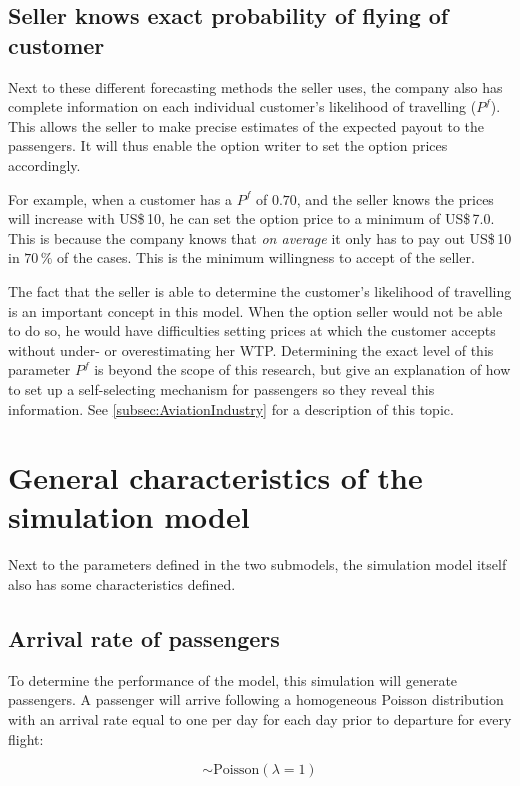 \subsection{Seller knows exact probability of flying of customer}
Next to these different forecasting methods the seller uses, the company also has complete information on each individual customer's likelihood of travelling ($P^f$). This allows the seller to make precise estimates of the expected payout to the passengers. It will thus enable the option writer to set the option prices accordingly.

For example, when a customer has a $P^f$ of $0.70$, and the seller knows the prices will increase with US\$\,10, he can set the option price to a minimum of US\$\,7.0. This is because the company knows that \emph{on average} it only has to pay out US\$\,10 in $70\,\%$ of the cases. This is the minimum willingness to accept of the seller.

The fact that the seller is able to determine the customer's likelihood of travelling is an important concept in this model. When the option seller would not be able to do so, he would have difficulties setting prices at which the customer accepts without under- or overestimating her WTP. Determining the exact level of this parameter $P^f$ is beyond the scope of this research, but  give an explanation of how to set up a self-selecting mechanism for passengers so they reveal this information. See \autoref{subsec:AviationIndustry} for a description of this topic.



\section{General characteristics of the simulation model}
Next to the parameters defined in the two submodels, the simulation model itself also has some characteristics defined.

\subsection{Arrival rate of passengers}
To determine the performance of the model, this simulation will generate passengers. A passenger will arrive following a homogeneous Poisson distribution with an arrival rate equal to one per day for each day prior to departure for every flight:

$$ \sim \mbox{Poisson}(\lambda = 1) $$

